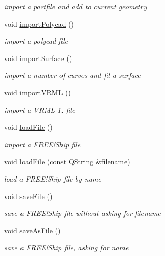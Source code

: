 \begin{DoxyCompactItemize}
\begin{DoxyCompactList}\small\item\em import a partfile and add to current geometry \end{DoxyCompactList}\item 
void \hyperlink{classShipCAD_1_1Controller_a7ec129046c11bd2be6cc388ca85206ce}{import\-Polycad} ()
\begin{DoxyCompactList}\small\item\em import a polycad file \end{DoxyCompactList}\item 
void \hyperlink{classShipCAD_1_1Controller_a229916f691507a3fa9393d0f9fbc1de5}{import\-Surface} ()
\begin{DoxyCompactList}\small\item\em import a number of curves and fit a surface \end{DoxyCompactList}\item 
void \hyperlink{classShipCAD_1_1Controller_a52d924f36259b6ec401acb6165922dc2}{import\-V\-R\-M\-L} ()
\begin{DoxyCompactList}\small\item\em import a V\-R\-M\-L 1. file \end{DoxyCompactList}\item 
void \hyperlink{classShipCAD_1_1Controller_ab2155421e40b1a2b19e79307aab7563b}{load\-File} ()
\begin{DoxyCompactList}\small\item\em import a F\-R\-E\-E!\-Ship file \end{DoxyCompactList}\item 
void \hyperlink{classShipCAD_1_1Controller_a7415bce07d64323be6b9d97885aa0875}{load\-File} (const Q\-String \&filename)
\begin{DoxyCompactList}\small\item\em load a F\-R\-E\-E!\-Ship file by name \end{DoxyCompactList}\item 
void \hyperlink{classShipCAD_1_1Controller_a4dbd04dffa55a42ec77f15d45909d55c}{save\-File} ()
\begin{DoxyCompactList}\small\item\em save a F\-R\-E\-E!\-Ship file without asking for filename \end{DoxyCompactList}\item 
void \hyperlink{classShipCAD_1_1Controller_aca904c26a74e79801deabfa8d863c92d}{save\-As\-File} ()
\begin{DoxyCompactList}\small\item\em save a F\-R\-E\-E!\-Ship file, asking for name \end{DoxyCompactList}\item 

\end{DoxyCompactItemize}
